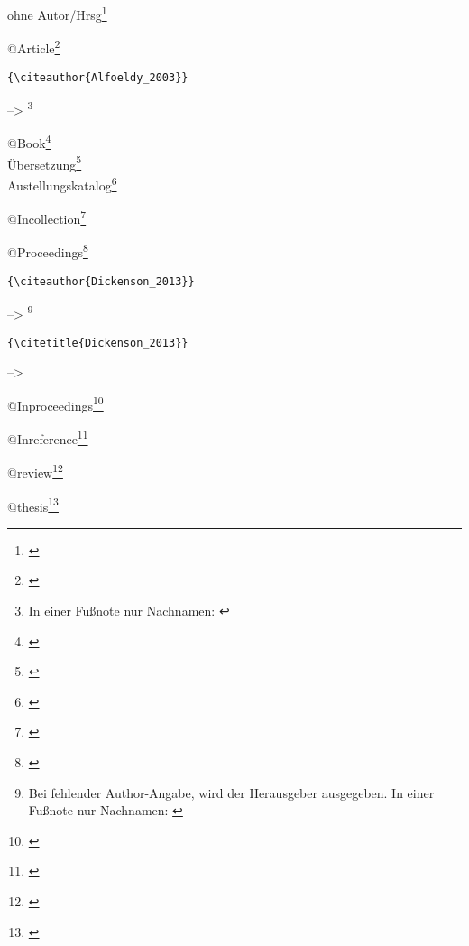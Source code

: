 \documentclass[%
	english,ngerman,%
	11pt,
	paper=A4,					%
draft=false,						%
demo,
	parskip=half+,				%
]{scrreprt}%
\begin{document}
ohne Autor/Hrsg\footnote{\cite{Italie_1976,Cosa_1949,Paestum_1854,Ercolano_1762}}


@Article\footnote{
\cite{Alfoeldy_2003,Allison_2001,Andreae_1957,Anichini_2012,Babcock_1962,Ball_2013,Bartosiewicz_2003,Baumgart_1935}
}
\begin{footnotesize}
\begin{verbatim}{\citeauthor{Alfoeldy_2003}} \end{verbatim} --> \citeauthor{Alfoeldy_2003}\footnote{In einer Fußnote nur Nachnamen: \citeauthor{Alfoeldy_2003}}
\end{footnotesize}

@Book\footnote{\cite{Beard_2008,Haug_2003,Hilger_2011,Kienast_2004,Kleinwaechter_2001,Kreikenbom_2011,Pedley_1990,Rich_2002}}\\
Übersetzung\footnote{\cite{Lefebvre_2000,Lefebvre_2011}}\\
Austellungskatalog\footnote{\cite{Horn_1976}}

@Incollection\footnote{\cite{Brogiolo_2006,Burgio_2012,Calapa_2009,Christie_2009,Colin_2000,Davies_2014,Demandt_1982}}

@Proceedings\footnote{\cite{Dickenson_2013,Giannikouri_2011,Hekster_2009,Kurapkat_2014,Maggi_2011}}
\\
\begin{footnotesize}
\begin{verbatim}{\citeauthor{Dickenson_2013}} \end{verbatim} --> \citeauthor{Dickenson_2013}\footnote{Bei fehlender Author-Angabe, wird der Herausgeber ausgegeben. In einer Fußnote nur Nachnamen:  \citeauthor{Dickenson_2013}}
\begin{verbatim}{\citetitle{Dickenson_2013}} \end{verbatim}  --> 
\end{footnotesize}

@Inproceedings\footnote{\cite{Bacchetta_2011,Coqueugniot_2011,Danner_2014,Poupaki_2011,Santoriello_1999,Torelli_1991,Torelli_1988,Tosi_1995}}

@Inreference\footnote{\cite{Rosenberger_2012,Booms_2014,CiancioRossetto_1993,Eder_2001a,Graffunder_1914,Jongman_2001,Kornemann_1933}}

@review\footnote{\cite{Baker_2011,Bell_2011,Bernard_2013,Chamberland_1999,Dyson_2013,Earl_2009,Frost_2001,Giuliano_1978,Hufschmid_2010,Kaiser_2014a}}

@thesis\footnote{\cite{Arnolds_2005,Evangelidis_2007,Hoevelborn_1983,Johanson_2008,Kienlin_2004a}}
\end{document}
